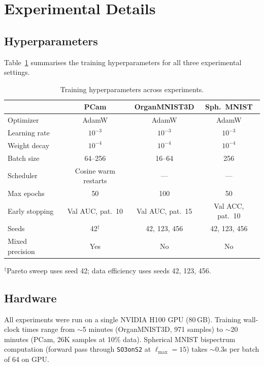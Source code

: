 \documentclass{article}
\begin{document}
\section{Experimental Details}
\label{app:exp}

\subsection{Hyperparameters}

Table~\ref{tab:hyperparams} summarises the training hyperparameters
for all three experimental settings.

\begin{table}[h]
  \caption{Training hyperparameters across experiments.}
  \label{tab:hyperparams}
  \centering
  \small
  \setlength{\tabcolsep}{4pt}
  \begin{tabular}{lccc}
    \toprule
    & PCam & OrganMNIST3D & Sph.\ MNIST \\
    \midrule
    Optimizer      & AdamW & AdamW & AdamW \\
    Learning rate  & $10^{-3}$ & $10^{-3}$ & $10^{-3}$ \\
    Weight decay   & $10^{-4}$ & $10^{-4}$ & $10^{-4}$ \\
    Batch size     & 64--256 & 16--64 & 256 \\
    Scheduler      & Cosine warm restarts & --- & --- \\
    Max epochs     & 50 & 100 & 50 \\
    Early stopping & Val AUC, pat.\ 10 & Val AUC, pat.\ 15 & Val ACC, pat.\ 10 \\
    Seeds          & 42$^\dagger$ & 42, 123, 456 & 42, 123, 456 \\
    Mixed precision & Yes & No & No \\
    \bottomrule
  \end{tabular}

  \vspace{0.3em}
  {\small $^\dagger$Pareto sweep uses seed 42; data efficiency uses seeds 42, 123, 456.}
\end{table}

\subsection{Hardware}

All experiments were run on a single NVIDIA H100 GPU (80\,GB).
Training wall-clock times range from ${\sim}$5 minutes (OrganMNIST3D,
971 samples) to ${\sim}$20 minutes (PCam, 26K samples at 10\% data).
Spherical MNIST bispectrum computation (forward pass through
\texttt{SO3onS2} at $\ell_{\max} = 15$) takes ${\sim}$0.3s per batch
of 64 on GPU.
\end{document}
